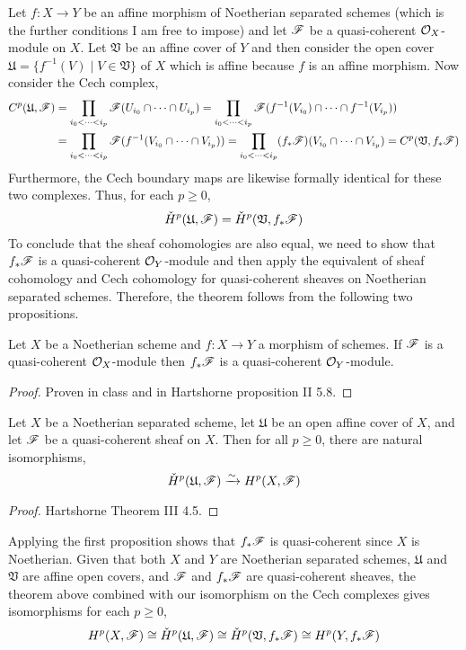 \documentclass[12pt]{article}
\begin{document}
Let $f : X \to Y$ be an affine morphism of Noetherian separated schemes (which is the further conditions I am free to impose) and let $\mathscr{F}$ be a quasi-coherent $\mathcal{O}_{X}$-module on $X$. Let $\mathfrak{V}$ be an affine cover of $Y$ and then consider the open cover $\mathfrak{U} = \{ f^{-1}(V) \mid V \in \mathfrak{V} \}$ of $X$ which is affine because $f$ is an affine morphism. Now consider the Cech complex,
\begin{align*}
C^p(\mathfrak{U}, \mathscr{F}) & = \prod_{i_0 < \dots < i_p} \mathscr{F}(U_{i_0} \cap \cdots \cap U_{i_p}) = \prod_{i_0 < \dots < i_p} \mathscr{F}(f^{-1}(V_{i_0}) \cap \cdots \cap f^{-1}(V_{i_p})) 
\\
& = \prod_{i_0 < \dots < i_p} \mathscr{F}(f^{-1}(V_{i_0} \cap \cdots \cap V_{i_p})) 
= \prod_{i_0 < \dots < i_p} (f_*\mathscr{F})(V_{i_0} \cap \cdots \cap V_{i_p}) = C^p(\mathfrak{V}, f_* \mathscr{F})
\end{align*}
Furthermore, the Cech boundary maps are likewise formally identical for these two complexes. Thus, for each $p \ge 0$,
\[ \check{H}^p(\mathfrak{U}, \mathscr{F}) = \check{H}^p(\mathfrak{V}, f_* \mathscr{F}) \]
To conclude that the sheaf cohomologies are also equal, we need to show that $f_* \mathscr{F}$ is a quasi-coherent $\mathcal{O}_{Y}$-module and then apply the equivalent of sheaf cohomology and Cech cohomology for quasi-coherent sheaves on Noetherian separated schemes. Therefore, the theorem follows from the following two propositions.

\begin{proposition}
Let $X$ be a Noetherian scheme and $f : X \to Y$ a morphism of schemes. If $\mathscr{F}$ is a quasi-coherent $\mathcal{O}_{X}$-module then $f_* \mathscr{F}$  is a quasi-coherent $\mathcal{O}_{Y}$-module.
\end{proposition}

\begin{proof}
Proven in class and in Hartshorne proposition II 5.8.
\end{proof}

\begin{theorem}
Let $X$ be a Noetherian separated scheme, let $\mathfrak{U}$ be an open affine cover of $X$, and let $\mathscr{F}$ be a quasi-coherent sheaf on $X$. Then for all $ p \ge 0$, there are natural isomorphisms,
\[ \check{H}^p(\mathfrak{U}, \mathscr{F}) \xrightarrow{\sim} H^p(X, \mathscr{F}) \]
\end{theorem}

\begin{proof}
Hartshorne Theorem III 4.5. 
\end{proof}

Applying the first proposition shows that $f_* \mathscr{F}$ is quasi-coherent since $X$ is Noetherian. Given that both $X$ and $Y$ are Noetherian separated schemes, $\mathfrak{U}$ and $\mathfrak{V}$ are affine open covers, and $\mathscr{F}$ and $f_* \mathscr{F}$ are quasi-coherent sheaves, the theorem above combined with our isomorphism on the Cech complexes gives isomorphisms for each $p \ge 0$,
\[ H^p(X, \mathscr{F}) \cong \check{H}^p(\mathfrak{U}, \mathscr{F}) \cong \check{H}^p(\mathfrak{V}, f_* \mathscr{F}) \cong H^p(Y, f_* \mathscr{F}) \]
\end{document}
